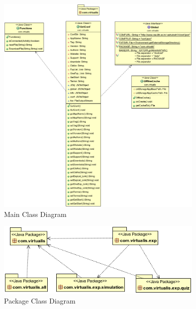 \documentclass[12pt]{report}
\begin{document}
\begin{figure}[H]
 \centering
 \includegraphics[width=10cm]{./class_main.png}
 \caption{Main Class Diagram\label{fig:class_main}}
\end{figure}

\begin{figure}[H]
 \centering
 \includegraphics[width=10cm]{./class_package.png}
 \caption{Package Class Diagram\label{fig:class_package}}
\end{figure}
\end{document}
